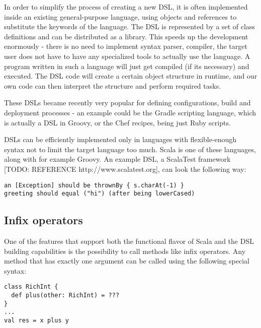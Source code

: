 In order to simplify the process of creating a new DSL, it is often implemented inside an existing general-purpose language, using objects and references to substitute the keywords of the language. The DSL is represented by a set of class definitions and can be distributed as a library. This speeds up the development enormously - there is no need to implement syntax parser, compiler, the target user does not have to have any specialized tools to actually use the language. A program written in such a language will just get compiled (if its necessary) and executed. The DSL code will create a certain object structure in runtime, and our own code can then interpret the structure and perform required tasks.

These DSLs became recently very popular for defining configurations, build and deployment processes - an example could be the Gradle scripting language, which is actually a DSL in Groovy, or the Chef recipes, being just Ruby scripts.

DSLs can be efficiently implemented only in languages with flexible-enough syntax not to limit the target language too much. Scala is one of these languages, along with for example Groovy. An example DSL, a ScalaTest framework [TODO: REFERENCE http://www.scalatest.org], can look the following way:

\lstset{style=Scala}
\begin{lstlisting}
an [Exception] should be thrownBy { s.charAt(-1) }
greeting should equal ("hi") (after being lowerCased)
\end{lstlisting}



\subsection{Infix operators}
\label{subsec:infixops}

One of the features that support both the functional flavor of Scala and the DSL building capabilities is the possibility to call methods like infix operators. Any method that has exactly one argument can be called using the following special syntax:

\lstset{style=Scala}
\begin{lstlisting}
class RichInt {
  def plus(other: RichInt) = ???
}
...
val res = x plus y
\end{lstlisting}

